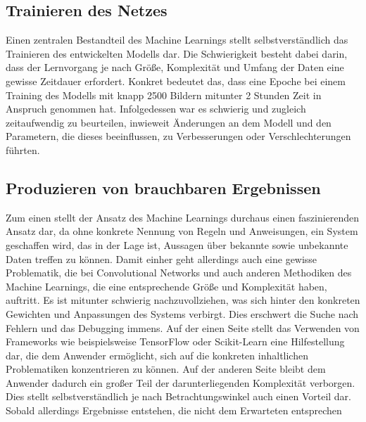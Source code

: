 \subsection{Trainieren des Netzes}

Einen zentralen Bestandteil des Machine Learnings stellt selbstverständlich das Trainieren des entwickelten Modells dar.
Die Schwierigkeit besteht dabei darin, dass der Lernvorgang je nach Größe, Komplexität und Umfang der Daten eine gewisse
Zeitdauer erfordert. Konkret bedeutet das, dass eine Epoche bei einem Training des Modells mit knapp 2500 Bildern mitunter
2 Stunden Zeit in Anspruch genommen hat. Infolgedessen war es schwierig und zugleich zeitaufwendig zu beurteilen,
inwieweit Änderungen an dem Modell und den Parametern, die dieses beeinflussen, zu Verbesserungen oder Verschlechterungen
führten.

\subsection{Produzieren von brauchbaren Ergebnissen}

Zum einen stellt der Ansatz des Machine Learnings durchaus einen faszinierenden Ansatz dar, da ohne konkrete Nennung von
Regeln und Anweisungen, ein System geschaffen wird, das in der Lage ist, Aussagen über bekannte sowie unbekannte Daten
treffen zu können. Damit einher geht allerdings auch eine gewisse Problematik, die bei Convolutional Networks und auch
anderen Methodiken des Machine Learnings, die eine entsprechende Größe und Komplexität haben, auftritt. Es ist mitunter
schwierig nachzuvollziehen, was sich hinter den konkreten Gewichten und Anpassungen des Systems verbirgt. Dies erschwert
die Suche nach Fehlern und das Debugging immens.
Auf der einen Seite stellt das Verwenden von Frameworks wie beispielsweise TensorFlow oder Scikit-Learn eine Hilfestellung
dar, die dem Anwender ermöglicht, sich auf die konkreten inhaltlichen Problematiken konzentrieren zu können. Auf der
anderen Seite bleibt dem Anwender dadurch ein großer Teil der darunterliegenden Komplexität verborgen. Dies stellt
selbstverständlich je nach Betrachtungswinkel auch einen Vorteil dar. Sobald allerdings Ergebnisse entstehen, die nicht
dem Erwarteten entsprechen


